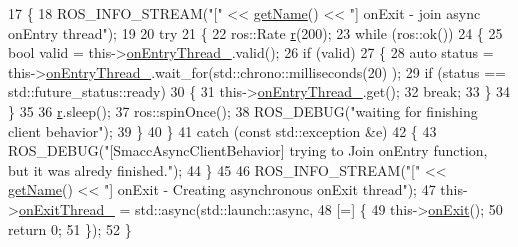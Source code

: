 \begin{DoxyCode}
17     \{
18         ROS\_INFO\_STREAM(\textcolor{stringliteral}{"["} << \hyperlink{classsmacc_1_1ISmaccClientBehavior_a18e4bec9460b010f2894c0f7e7064a34}{getName}() << \textcolor{stringliteral}{"] onExit - join async onEntry thread"});
19 
20         \textcolor{keywordflow}{try}
21         \{
22             ros::Rate \hyperlink{namespacefake__cube__perception__node_a36e88703ab69fd35065e8a8d9344903e}{r}(200);
23             \textcolor{keywordflow}{while} (ros::ok())
24             \{
25                 \textcolor{keywordtype}{bool} valid = this->\hyperlink{classsmacc_1_1SmaccAsyncClientBehavior_a6346e036a68f41c4397d7336f8519645}{onEntryThread\_}.valid();
26                 \textcolor{keywordflow}{if} (valid)
27                 \{
28                     \textcolor{keyword}{auto} status = this->\hyperlink{classsmacc_1_1SmaccAsyncClientBehavior_a6346e036a68f41c4397d7336f8519645}{onEntryThread\_}.wait\_for(std::chrono::milliseconds(20)
      );
29                     \textcolor{keywordflow}{if} (status == std::future\_status::ready)
30                     \{
31                         this->\hyperlink{classsmacc_1_1SmaccAsyncClientBehavior_a6346e036a68f41c4397d7336f8519645}{onEntryThread\_}.get();
32                         \textcolor{keywordflow}{break};
33                     \}
34                 \}
35 
36                 \hyperlink{namespacefake__cube__perception__node_a36e88703ab69fd35065e8a8d9344903e}{r}.sleep();
37                 ros::spinOnce();
38                 ROS\_DEBUG(\textcolor{stringliteral}{"waiting for finishing client behavior"});
39             \}
40         \}
41         \textcolor{keywordflow}{catch} (\textcolor{keyword}{const} std::exception &e)
42         \{
43             ROS\_DEBUG(\textcolor{stringliteral}{"[SmaccAsyncClientBehavior] trying to Join onEntry function, but it was alredy
       finished."});
44         \}
45 
46         ROS\_INFO\_STREAM(\textcolor{stringliteral}{"["} << \hyperlink{classsmacc_1_1ISmaccClientBehavior_a18e4bec9460b010f2894c0f7e7064a34}{getName}() << \textcolor{stringliteral}{"] onExit - Creating asynchronous onExit thread"});
47         this->\hyperlink{classsmacc_1_1SmaccAsyncClientBehavior_af76d1c36b4a10425f2da043545b73299}{onExitThread\_} = std::async(std::launch::async,
48                                          [=] \{
49                                              this->\hyperlink{classsmacc_1_1ISmaccClientBehavior_ad1198fdb2cbdf11f3276d3e23d4c0a50}{onExit}();
50                                              \textcolor{keywordflow}{return} 0;
51                                          \});
52     \}
\end{DoxyCode}
